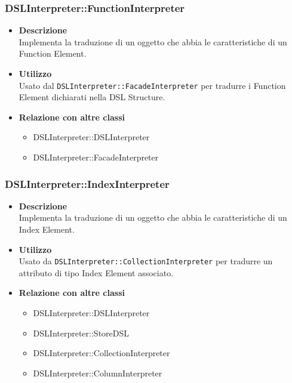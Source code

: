 \subsubsection{DSLInterpreter::FunctionInterpreter}
\begin{itemize}
\item \textbf{Descrizione} \hfill \\
  Implementa la traduzione di un oggetto che abbia le caratteristiche di un Function Element.
\item \textbf{Utilizzo} \hfill \\
  Usato dal \texttt{DSLInterpreter::FacadeInterpreter} per tradurre i Function Element dichiarati nella DSL Structure.
\item \textbf{Relazione con altre classi}
  \begin{itemize}
  \item DSLInterpreter::DSLInterpreter
  \item DSLInterpreter::FacadeInterpreter
  \end{itemize}
\end{itemize}

\subsubsection{DSLInterpreter::IndexInterpreter}
\begin{itemize}
\item \textbf{Descrizione} \hfill \\
  Implementa la traduzione di un oggetto che abbia le caratteristiche di un Index Element.
\item \textbf{Utilizzo} \hfill \\
  Usato da \texttt{DSLInterpreter::CollectionInterpreter} per tradurre un attributo di tipo Index Element associato.
\item \textbf{Relazione con altre classi}
  \begin{itemize}
  \item DSLInterpreter::DSLInterpreter
  \item DSLInterpreter::StoreDSL
  \item DSLInterpreter::CollectionInterpreter
  \item DSLInterpreter::ColumnInterpreter
  \end{itemize}
\end{itemize}

